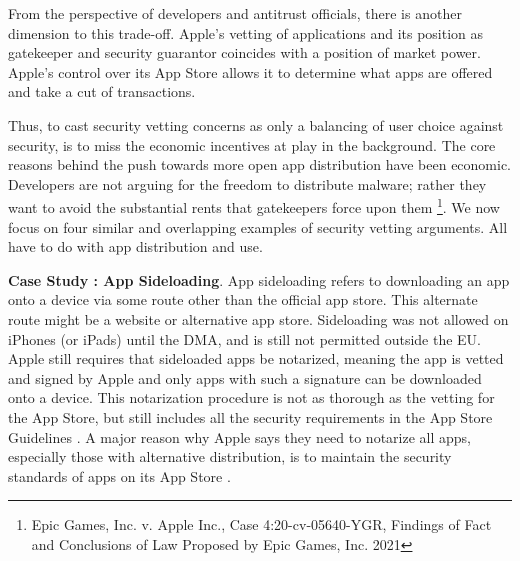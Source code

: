 \documentclass[letterpaper,twocolumn,10pt]{article}
\newcommand{\subh}[1]{\smallskip \noindent \textbf{{#1}}.}
\renewcommand{\paragraph}[1]{\subh{#1}}
\begin{document}
From the perspective of developers and antitrust officials, there is another dimension to this trade-off.  Apple's vetting of applications and its position as gatekeeper and security guarantor coincides with a position of market power.  Apple's control over its App Store allows it to determine what apps are offered and take a cut of transactions. 

Thus, to cast security vetting concerns as only a balancing of user choice against security, is to miss the economic incentives at play in the background.  The core reasons behind the push towards more open app distribution have been economic. Developers are not arguing for the freedom to distribute malware; rather they want to avoid the substantial rents that gatekeepers force upon them \footnote{Epic Games, Inc. v. Apple Inc., Case 4:20-cv-05640-YGR, Findings of Fact and Conclusions of Law Proposed by Epic Games, Inc. 2021}.
We now focus on four similar and overlapping examples of security vetting arguments.
All have to do with app distribution and use.

\paragraph{Case Study \thecasestudy: App Sideloading}
App sideloading refers to downloading an app onto a device via some route other than the official app store. This alternate route might be a website or alternative app store. %
Sideloading was not allowed on iPhones (or iPads) until the DMA, and is still not permitted outside the EU. Apple still requires that sideloaded apps be notarized, meaning the app is vetted and signed by Apple and only apps with such a signature can be downloaded onto a device.  This notarization procedure is not as thorough as the vetting for the App Store, but still includes all the security requirements in the App Store Guidelines \cite{apple_app_review}. A major reason why Apple says they need to notarize all apps, especially those with alternative distribution, is to maintain the security standards of apps on its App Store \cite{apple_white_paper}.
\end{document}
